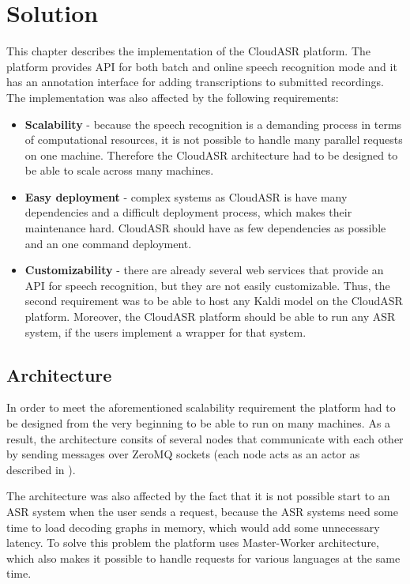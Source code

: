 \chapter{Solution}
This chapter describes the implementation of the CloudASR platform.
The platform provides API for both batch and online speech recognition mode
  and it has an annotation interface for adding transcriptions to submitted recordings.
The implementation was also affected by the following requirements:

\begin{itemize}
  \item
    \textbf{Scalability} -
      because the speech recognition is a demanding process in terms of computational resources,
        it is not possible to handle many parallel requests on one machine.
      Therefore the CloudASR architecture had to be designed to be able to scale across many machines.

  \item
    \textbf{Easy deployment} -
      complex systems as CloudASR is have many dependencies and a difficult deployment process,
        which makes their maintenance hard.
      CloudASR should have as few dependencies as possible and an one command deployment.

  \item
    \textbf{Customizability} -
       there are already several web services that provide an API for speech recognition,
         but they are not easily customizable.
       Thus, the second requirement was to be able to host any Kaldi model on  the CloudASR platform.
       Moreover, the CloudASR platform should be able to run any ASR system,
         if the users implement a wrapper for that system.

\end{itemize}


\section{Architecture}
In order to meet the aforementioned scalability requirement
  the platform had to be designed from the very beginning to be able to run on many machines.
As a result, the architecture consits of several nodes
  that communicate with each other by sending messages over ZeroMQ sockets
  (each node acts as an actor as described in \cite{hewitt1977viewing}).

The architecture was also affected by the fact
  that it is not possible start to an ASR system when the user sends a request,
  because the ASR systems need some time to load decoding graphs in memory,
  which would add some unnecessary latency.
To solve this problem the platform uses Master-Worker architecture,
  which also makes it possible to handle requests for various languages at the same time.

